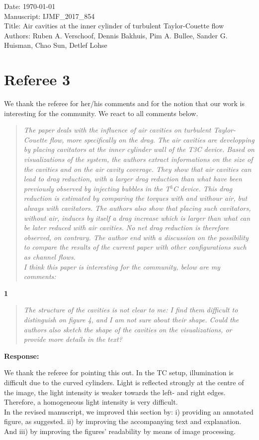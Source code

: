 \documentclass[10pt]{article}
\newcommand{\strong}[1]{\textbf{#1}}
\newcommand{\question}[1]{\begin{quote} \emph{#1}  \end{quote} }
\begin{document}
\noindent Date: \today \\
Manuscript: IJMF\_2017\_854\\
Title: Air cavities at the inner cylinder of turbulent Taylor-Couette flow \\
Authors: Ruben A. Verschoof, Dennis Bakhuis, Pim A. Bullee, Sander G. Huisman, Chao Sun, Detlef Lohse

\vspace*{1.25cm}
\section*{Referee 3}
We thank the referee for her/his comments and for the notion that our work is interesting for the community. We react to all comments below.

\question{The paper deals with the influence of air cavities on turbulent Taylor-Couette flow, more specifically on the drag. The air cavities are developping by placing cavitators at the inner cylinder wall of the T3C device. Based on visualizations of the system, the authors extract informations on the size of the cavities and on the air cavity coverage. They show that air cavities can lead to drag reduction, with a larger drag reduction than what have been previously observed by injecting bubbles in the T$^3$C device. This drag reduction is estimated by comparing the torques with and withour air, but always with cavitators. The authors also show that placing such cavitators, without air, induces by itself a drag increase which is larger than what can be later reduced with air cavities. No net drag reduction is therefore observed, on contrary. The author end with a discussion on the possibility to compare the results of the current paper with other configurations such as channel flows. \\
I think this paper is interesting for the community, below are my comments:}

\noindent \strong{1}

\question{The structure of the cavities is not clear to me: I find them difficult to distinguish on figure 4, and I am not sure about their shape. Could the authors also sketch the shape of the cavities on the visualizations, or provide more details in the text?  }

\noindent \strong{Response:} 

\noindent We thank the referee for pointing this out. In the TC setup, illumination is difficult due to the curved cylinders. Light is reflected strongly at the centre of the image, the light intensity is weaker towards the left- and right edges. Therefore, a homogeneous light intensity is very difficult. \\
In the revised manuscript, we improved this section by: i) providing an annotated figure, as suggested. ii) by improving the accompanying text and explanation. And iii) by improving the figures' readability by means of image processing. \\
	 
\end{document}
